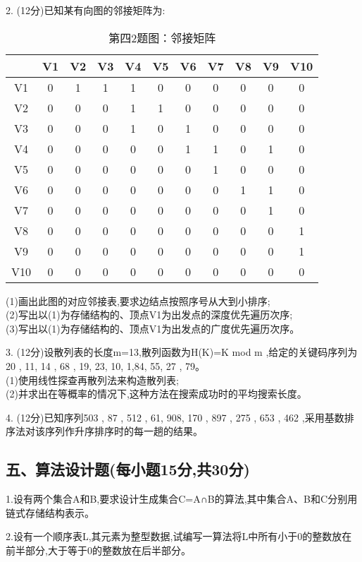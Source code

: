 2. (12分)已知某有向图的邻接矩阵为:
\begin{table}[ht]
\centering
\caption{第四2题图：邻接矩阵}\label{tab_ZSDS13_1}
\begin{tabular}{|c|c|c|c|c|c|c|c|c|c|c|}
\hline
 & V1 & V2 & V3 & V4 & V5 & V6 & V7 & V8 & V9 & V10 \\
\hline
V1 & 0 & 1 & 1 & 1 & 0 & 0 & 0 & 0 & 0 & 0 \\
\hline
V2 & 0 & 0 & 0 & 1 & 1 & 0 & 0 & 0 & 0 & 0 \\
\hline
V3 & 0 & 0 & 0 & 1 & 0 & 1 & 0 & 0 & 0 & 0 \\
\hline
V4 & 0 & 0 & 0 & 0 & 0 & 1 & 1 & 0 & 1 & 0 \\
\hline
V5 & 0 & 0 & 0 & 0 & 0 & 0 & 1 & 0 & 0 & 0 \\
\hline
V6 & 0 & 0 & 0 & 0 & 0 & 0 & 0 & 1 & 1 & 0 \\
\hline
V7 & 0 & 0 & 0 & 0 & 0 & 0 & 0 & 0 & 1 & 0 \\
\hline
V8 & 0 & 0 & 0 & 0 & 0 & 0 & 0 & 0 & 0 & 1 \\
\hline
V9 & 0 & 0 & 0 & 0 & 0 & 0 & 0 & 0 & 0 & 1 \\
\hline
V10 & 0 & 0 & 0 & 0 & 0 & 0 & 0 & 0 & 0 & 0 \\
\hline
\end{tabular}
\end{table}
(1)画出此图的对应邻接表,要求边结点按照序号从大到小排序; \\
(2)写出以(1)为存储结构的、顶点V1为出发点的深度优先遍历次序; \\
(3)写出以(1)为存储结构的、顶点V1为出发点的广度优先遍历次序。

3. (12分)设散列表的长度m=13,散列函数为H(K)=K mod m ,给定的关键码序列为20 , 11, 14 , 68 , 19, 23, 10, 1,84, 55, 27 , 79。 \\
(1)使用线性探查再散列法来构造散列表; \\
(2)并求出在等概率的情况下,这种方法在搜索成功时的平均搜索长度。

4. (12分)已知序列{503 , 87 , 512 , 61, 908, 170 , 897 , 275 , 653 , 462} ,采用基数排序法对该序列作升序排序时的每一趟的结果。

\subsection{五、算法设计题(每小题15分,共30分)}

1.设有两个集合A和B,要求设计生成集合C=A∩B的算法,其中集合A、B和C分别用链式存储结构表示。

2.设有一个顺序表L,其元素为整型数据,试编写一算法将L中所有小于0的整数放在前半部分,大于等于0的整数放在后半部分。